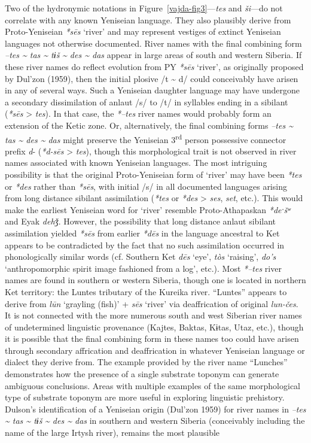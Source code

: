 Two of the hydronymic notations in Figure~\ref{vajda-fig3}---\textit{tes} and \textit{ši}---do not correlate with any known Yeniseian language. They also plausibly derive from Proto-Yeniseian \textit{*s\=es} ‘river’ and may represent vestiges of extinct Yeniseian languages not otherwise documented. River names with the final combining form \textit{–tes \~{} tas \~{} tɨš} \textit{\~{} des \~{} das }appear in large areas of south and western Siberia. If these river names do reflect evolution from PY \textit{*s\=es} ‘river’, as originally proposed by Dul’zon (1959), then the initial plosive /t \~{} d/ could conceivably have arisen in any of several ways. Such a Yeniseian daughter language may have undergone a secondary dissimilation of anlaut /s/ to /t/ in syllables ending in a sibilant (\textit{*s\=es} {\textgreater} \textit{tes}). In that case, the \textit{*–tes }river names would probably form an extension of the Ketic zone. Or, alternatively, the final combining forms \textit{–tes \~{} tas \~{} des \~{} das} might preserve the Yeniseian 3\textsuperscript{rd} person possessive connector prefix \textit{d}{}- (\textit{*d-s\=es} {\textgreater} \textit{tes}), though this morphological trait is not observed in river names associated with known Yeniseian languages. The most intriguing possibility is that the original Proto-Yeniseian form of ‘river’ may have been \textit{*tes} or \textit{*des} rather than \textit{*s\=es}, with initial /s/ in all documented languages arising from long distance sibilant assimilation (\textit{*tes }or\textit{ *des} {\textgreater} \textit{ses},\textit{ set}, etc.). This would make the earliest Yeniseian word for ‘river’ resemble Proto-Athapaskan \textit{*deˑšʷ} and Eyak \textit{dehǯ}. However, the possibility that long distance anlaut sibilant assimilation yielded \textit{*s\=es} from earlier \textit{*d\=es} in the language ancestral to Ket appears to be contradicted by the fact that no such assimilation occurred in phonologically similar words (cf. Southern Ket \textit{d\=es} ‘eye’, \textit{tòs} ‘raising’, \textit{do’s} ‘anthropomorphic spirit image fashioned from a log’, etc.). Most \textit{*–tes }river names are found in southern or western Siberia, though one is located in northern Ket territory: the Luntes tributary of the Kureika river. “Luntes” appears to derive from \textit{l\=un} ‘grayling (fish)’ + \textit{s\=es} ‘river’ via deaffrication of original \textit{lun-čes}. It is not connected with the more numerous south and west Siberian river names of undetermined linguistic provenance (Kajtes, Baktas, Kɨtas, Utaz, etc.), though it is possible that the final combining form in these names too could have arisen through secondary affrication and deaffrication in whatever Yeniseian language or dialect they derive from. The example provided by the river name “Lunches” demonstrates how the presence of a single substrate toponym can generate ambiguous conclusions. Areas with multiple examples of the same morphological type of substrate toponym are more useful in exploring linguistic prehistory. Dulson’s identification of a Yeniseian origin (Dul’zon 1959) for river names in \textit{–tes \~{} tas \~{} tɨš} \textit{\~{} des \~{} das }in southern and western Siberia (conceivably including the name of the large Irtysh river), remains the most plausible 
